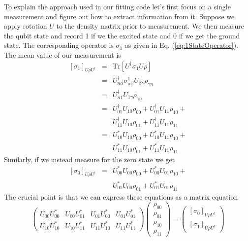 \documentclass[twocolumn]{article}
\begin{document}
To explain the approach used in our fitting code let's first focus on a single measurement and figure out how to extract information from it. Suppose we apply rotation $U$ to the density matrix prior to measurement. We then measure the qubit state and record 1 if we the excited state and 0 if we get the ground state. The corresponding operator is $\sigma_1$ as given in Eq. (\ref{eq:1StateOperator}). The mean value of our measurement is \begin{eqnarray}
\left[ \sigma_1 \right] _{U \rho U^{\dagger}} &=& \textrm{Tr} \left[ U^{\dagger} \sigma_1 U \rho \right] \\
&=& U_{n \alpha}^{\dagger} \sigma^1_{\alpha\beta}U_{\beta \gamma}\rho_{\gamma n} \\
&=& U_{n1}^{\dagger} U_{1 \gamma} \rho_{\gamma n} \\
&=& U_{01}^{\dagger} U_{10} \rho_{00} + U_{01}^{\dagger} U_{11} \rho_{10} + \\
& & U_{11}^{\dagger} U_{10} \rho_{01} + U_{11}^{\dagger} U_{11} \rho_{11} \\
&=& U_{10}^* U_{10} \rho_{00} + U_{10}^* U_{11} \rho_{10} + \\
& & U_{11}^* U_{10} \rho_{01} + U_{11}^* U_{11} \rho_{11} \end{eqnarray}
Similarly, if we instead measure for the zero state we get \begin{eqnarray}
\left[ \sigma_0 \right]_{U \rho U^{\dagger}} &=& U_{00}^* U_{00} \rho_{00} + U_{00}^* U_{01} \rho_{10} + \nonumber \\
& & U_{01}^* U_{00} \rho_{01} + U_{01}^* U_{01} \rho_{11} \end{eqnarray}
The crucial point is that we can express these equations as a matrix equation \begin{equation}
\left( \begin{array}{cccc}
U_{00}U_{00}^* & U_{00}U_{01}^* & U_{01}U_{00}^* & U_{01}U_{01}^* \\
U_{10}U_{10}^* & U_{10}U_{11}^* & U_{11}U_{10}^* & U_{11}U_{11}^*
\end{array} \right) \left( \begin{array}{c}
\rho_{00} \\ \rho_{01} \\ \rho_{10} \\ \rho_{11} \end{array} \right) = 
\left( \begin{array}{c} \left[\sigma_0 \right]_{U \rho U^{\dagger}} \\ \left[ \sigma_1 \right]_{U \rho U^{\dagger}} \end{array} \right)
\end{equation}
\end{document}
